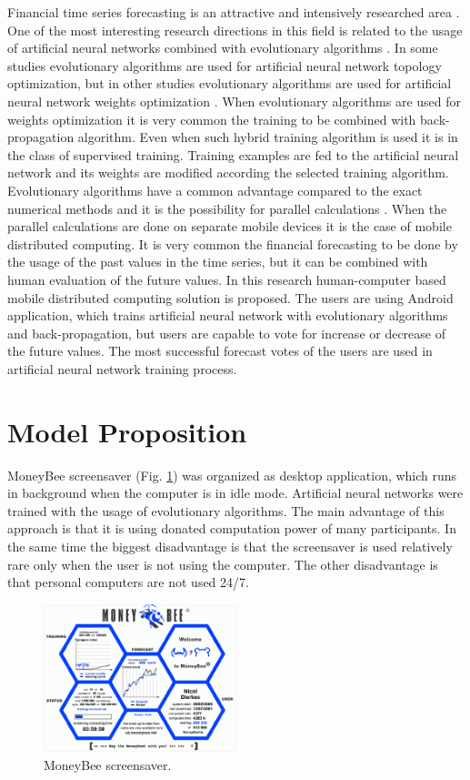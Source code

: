 \documentclass[11pt]{article}
\begin{document}
Financial time series forecasting is an attractive and intensively researched area \cite{nava01}. One of the most interesting research directions in this field is related to the usage of artificial neural networks combined with evolutionary algorithms \cite{zhang01}. In some studies evolutionary algorithms are used for artificial neural network topology optimization, but in other studies evolutionary algorithms are used for artificial neural network weights optimization \cite{aljarah01}. When evolutionary algorithms are used for weights optimization it is very common the training to be combined with back-propagation algorithm. Even when such hybrid training algorithm is used it is in the class of supervised training. Training examples are fed to the artificial neural network and its weights are modified according the selected training algorithm. Evolutionary algorithms have a common advantage compared to the exact numerical methods and it is the possibility for parallel calculations \cite{altinoz01}. When the parallel calculations are done on separate mobile devices it is the case of mobile distributed computing. It is very common the financial forecasting to be done by the usage of the past values in the time series, but it can be combined with human evaluation of the future values. In this research human-computer based mobile distributed computing solution is proposed. The users are using Android application, which trains artificial neural network with evolutionary algorithms and back-propagation, but users are capable to vote for increase or decrease of the future values. The most successful forecast votes of the users are used in artificial neural network training process.

\section{Model Proposition} \label{Model Proposition}

MoneyBee screensaver (Fig. \ref{fig01}) was organized as desktop application, which runs in background when the computer is in idle mode. Artificial neural networks were trained with the usage of evolutionary algorithms. The main advantage of this approach is that it is using donated computation power of many participants. In the same time the biggest disadvantage is that the screensaver is used relatively rare only when the user is not using the computer. The other disadvantage is that personal computers are not used 24/7.

\begin{figure}
\includegraphics[width=0.5\textwidth]{fig01.png}
\centering
\caption{MoneyBee screensaver.} \label{fig01}
\end{figure}
\FloatBarrier
\end{document}
